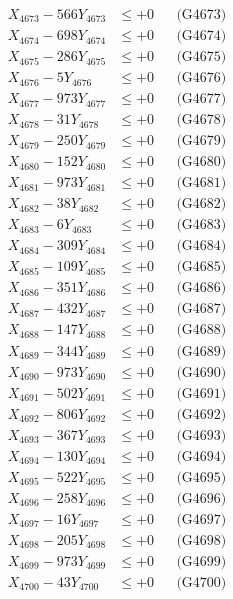 \documentclass[a4paper,10pt]{article}
\begin{document}
{\begin{align}
X_{4673} - 566Y_{4673} &\leq +0 && \text{(G4673)} \\
X_{4674} - 698Y_{4674} &\leq +0 && \text{(G4674)} \\
X_{4675} - 286Y_{4675} &\leq +0 && \text{(G4675)} \\
X_{4676} - 5Y_{4676} &\leq +0 && \text{(G4676)} \\
X_{4677} - 973Y_{4677} &\leq +0 && \text{(G4677)} \\
X_{4678} - 31Y_{4678} &\leq +0 && \text{(G4678)} \\
X_{4679} - 250Y_{4679} &\leq +0 && \text{(G4679)} \\
X_{4680} - 152Y_{4680} &\leq +0 && \text{(G4680)} \\
\allowbreak
X_{4681} - 973Y_{4681} &\leq +0 && \text{(G4681)} \\
X_{4682} - 38Y_{4682} &\leq +0 && \text{(G4682)} \\
X_{4683} - 6Y_{4683} &\leq +0 && \text{(G4683)} \\
X_{4684} - 309Y_{4684} &\leq +0 && \text{(G4684)} \\
X_{4685} - 109Y_{4685} &\leq +0 && \text{(G4685)} \\
X_{4686} - 351Y_{4686} &\leq +0 && \text{(G4686)} \\
X_{4687} - 432Y_{4687} &\leq +0 && \text{(G4687)} \\
X_{4688} - 147Y_{4688} &\leq +0 && \text{(G4688)} \\
X_{4689} - 344Y_{4689} &\leq +0 && \text{(G4689)} \\
X_{4690} - 973Y_{4690} &\leq +0 && \text{(G4690)} \\
\allowbreak
X_{4691} - 502Y_{4691} &\leq +0 && \text{(G4691)} \\
X_{4692} - 806Y_{4692} &\leq +0 && \text{(G4692)} \\
X_{4693} - 367Y_{4693} &\leq +0 && \text{(G4693)} \\
X_{4694} - 130Y_{4694} &\leq +0 && \text{(G4694)} \\
X_{4695} - 522Y_{4695} &\leq +0 && \text{(G4695)} \\
X_{4696} - 258Y_{4696} &\leq +0 && \text{(G4696)} \\
X_{4697} - 16Y_{4697} &\leq +0 && \text{(G4697)} \\
X_{4698} - 205Y_{4698} &\leq +0 && \text{(G4698)} \\
X_{4699} - 973Y_{4699} &\leq +0 && \text{(G4699)} \\
X_{4700} - 43Y_{4700} &\leq +0 && \text{(G4700)} \\

\end{align}}
\end{document}
